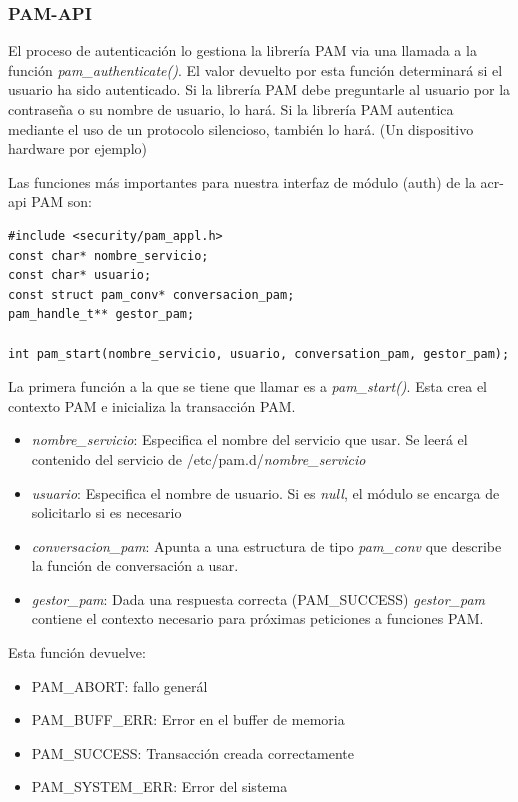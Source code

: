 \documentclass[twoside, titlepage, 12pt, a4paper]{article}
\begin{document}
\subsubsection{PAM-API}
El proceso de autenticación lo gestiona la librería PAM via una llamada a la función \textit{pam\_authenticate()}. El valor devuelto por esta función determinará si el usuario ha sido autenticado. Si la librería PAM debe preguntarle al usuario por la contraseña o su nombre de usuario, lo hará. Si la librería PAM autentica mediante el uso de un protocolo silencioso, también lo hará. (Un dispositivo hardware por ejemplo)\cite{linux-pam-application} \par
Las funciones más importantes para nuestra interfaz de módulo (auth) de la \gls{acr-api} PAM son:
\begin{lstlisting}
#include <security/pam_appl.h>
const char* nombre_servicio;
const char* usuario;
const struct pam_conv* conversacion_pam;
pam_handle_t** gestor_pam;

int pam_start(nombre_servicio, usuario, conversation_pam, gestor_pam);
\end{lstlisting}
La primera función a la que se tiene que llamar es a \textit{pam\_start()}. Esta crea el contexto PAM e inicializa la transacción PAM.\par
\begin{itemize}
	\item{\textit{nombre\_servicio}: Especifica el nombre del servicio que usar. Se leerá el contenido del servicio de /etc/pam.d/\textit{nombre\_servicio}}
	\item{\textit{usuario}: Especifica el nombre de usuario. Si es \textit{null}, el módulo se encarga de solicitarlo si es necesario}
	\item{\textit{conversacion\_pam}: Apunta a una estructura de tipo \textit{pam\_conv} que describe la función de conversación a usar.}
	\item{\textit{gestor\_pam}: Dada una respuesta correcta (PAM\_SUCCESS) \textit{gestor\_pam} contiene el contexto necesario para próximas peticiones a funciones PAM.}
\end{itemize} 
Esta función devuelve:
\begin{itemize}
	\item{PAM\_ABORT: fallo generál}
	\item{PAM\_BUFF\_ERR: Error en el buffer de memoria}
	\item{PAM\_SUCCESS: Transacción creada correctamente}
	\item{PAM\_SYSTEM\_ERR: Error del sistema}
\end{itemize} \par
\end{document}

